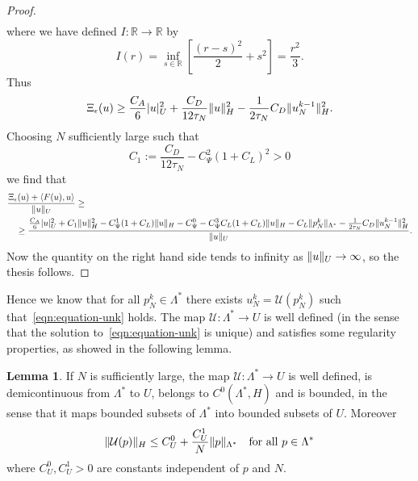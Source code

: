 \documentclass[a4paper,10pt,twoside]{amsbook}
\numberwithin{section}{chapter}
\numberwithin{equation}{chapter}
\theoremstyle{definition}
\newtheorem{lemma}[prop]{Lemma}
\DeclarePairedDelimiter{\norm}{\lVert}{\rVert}
\DeclarePairedDelimiter{\dual}{\langle}{\rangle}
\begin{document}
\begin{proof}
\[\begin{split}
\end{split}
\]
where we have defined $I\colon\mathbb{R}\to\mathbb{R}$ by
\[
I(r)=\inf_{s\in\mathbb{R}}\left[\frac{(r-s)^2}{2}+s^2\right]=\frac{r^2}{3}.
\]
Thus
\[
\Xi_\epsilon(u)\ge\frac{C_A}{6}|u|_U^2+\frac{C_D}{12\tau_N}\norm{u}_H^2-\frac{1}{2\tau_N}C_D\norm{u_N^{k-1}}_H^2.
\]
Choosing $N$ sufficiently large such that
\[
C_1:=\frac{C_D}{12\tau_N}-C_\Psi^2(1+C_L)^2>0
\]
we find that
\[
\begin{multlined}
\frac{\Xi_\epsilon(u)+\dual{F(u),u}}{\norm{u}_U}\ge\\
\ge\frac{\frac{C_A}{6}|u|_U^2+C_1\norm{u}_H^2-C_\Psi^1(1+C_L)\norm{u}_H-C_\Psi^0-C_\Psi^3C_L(1+C_L)\norm{u}_H-C_L\norm{p_N^k}_{\Lambda^*}-\frac{1}{2\tau_N}C_D\norm{u_N^{k-1}}_H^2}{\norm{u}_U}.
\end{multlined}
\]
Now the quantity on the right hand side tends to infinity as $\norm{u}_U\to\infty$, so the thesis follows.
\end{proof}
Hence we know that for all $p_N^k\in\Lambda^*$ there exists $u_N^k=\mathcal{U}(p_N^k)$ such that~\eqref{eqn:equation-unk} holds. The map $\mathcal{U}\colon\Lambda^*\to U$ is well defined (in the sense that the solution to~\eqref{eqn:equation-unk} is unique) and satisfies some regularity properties, as showed in the following lemma.
\begin{lemma}
\label{lemma:properties-U}
If $N$ is sufficiently large, the map $\mathcal{U}\colon\Lambda^*\to U$ is well defined, is demicontinuous from $\Lambda^*$ to $U$, belongs to $C^0(\Lambda^*,H)$ and is bounded, in the sense that it maps bounded subsets of $\Lambda^*$ into bounded subsets of $U$. Moreover
\[
\norm{\mathcal{U}(p)}_H\le C_U^0+\frac{C_U^1}{N}\norm{p}_{\Lambda^*}\quad\text{for all $p\in\Lambda^*$}
\]
where $C_U^0,C_U^1>0$ are constants independent of $p$ and $N$.
\end{lemma}
\end{document}
